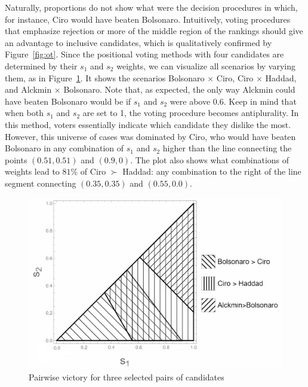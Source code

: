 \documentclass[hidelinks,11pt]{article} \usepackage[utf8]{inputenc}
\begin{document}
Naturally, proportions do not show what were the decision procedures in which,
for instance, Ciro would have beaten Bolsonaro. Intuitively, voting procedures
that emphasize rejection or more of the middle region of the rankings should
give an advantage to inclusive candidates, which is qualitatively confirmed by
Figure~\ref{fig:ot}. Since the positional voting methods with four candidates are
determined by their \(s_{1}\) and \(s_{2}\) weights, we can visualize all
scenarios by varying them, as in Figure~\ref{fig:positional4c}. It shows the scenarios Bolsonaro
\(\times\) Ciro, Ciro \(\times \) Haddad, and Alckmin \(\times\) Bolsonaro. Note that, as
expected, the only way Alckmin could have beaten Bolsonaro would be if \(s_{1}\)
and \(s_{2}\) were above 0.6. Keep in mind that when both \(s_{1}\) and
\(s_{2}\) are set to 1, the voting procedure becomes antiplurality. In this
method, voters essentially indicate which candidate they dislike the most.
However, this universe of cases was dominated by Ciro, who would have beaten
Bolsonaro in any combination of \(s_{1}\) and \(s_{2}\) higher than the line
connecting the points \((0.51,0.51)\) and \((0.9,0)\). The plot also shows what
combinations of weights lead to \(81\%\) of Ciro \(\succ\) Haddad: any
combination to the right of the line segment connecting \((0.35,0.35)\) and
\((0.55,0.0)\).

\begin{figure}[!h] \centering \includegraphics[width=\columnwidth,
height=0.3\textheight]{./images/counterfactual_triangle.jpg}
\caption{Pairwise victory for three selected pairs of candidates}
 \label{fig:positional4c}
\end{figure}
\end{document}
